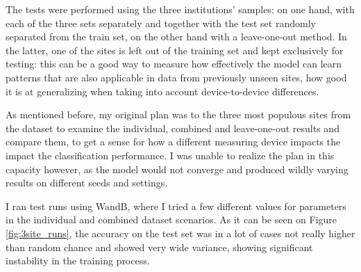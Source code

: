 	The tests were performed using the three institutions' samples: on one hand, with each of the three sets separately and together with the test set randomly separated from the train set, on the other hand with a leave-one-out method. In the latter, one of the sites is left out of the training set and kept exclusively for testing: this can be a good way to measure how effectively the model can learn patterns that are also applicable in data from previously unseen sites, how good it is at generalizing when taking into account device-to-device differences.
	
	As mentioned before, my original plan was to the three most populous sites from the dataset to examine the individual, combined and leave-one-out results and compare them, to get a sense for how a different measuring device impacts the impact the classification performance. I was unable to realize the plan in this capacity however, as the model would not converge and produced wildly varying results on different seeds and settings. 
	
	I ran test runs using WandB, where I tried a few different values for parameters in the individual and combined dataset scenarios. As it can be seen on Figure \ref{fig:3site_runs}, the accuracy on the test set was in a lot of cases not really higher than random chance and showed very wide variance, showing significant instability in the training process.
	

